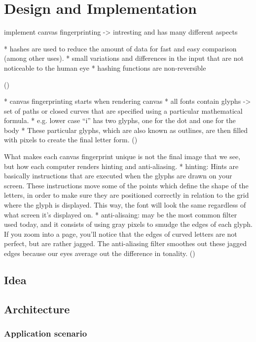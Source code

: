 \chapter{Design and Implementation}
\label{cha:implementation}
implement canvas fingerprinting -> intresting and has many different aspects


* hashes are used to reduce the amount of data for fast and easy comparison (among other uses).
* small variations and differences in the input that are not noticeable to the human eye
* hashing functions are non-reversible

(\textcite{multilogin17})

* canvas fingerprinting starts when rendering canvas
* all fonts contain glyphs ->  set of paths or closed curves that are specified using a particular mathematical formula. 
* e.g. lower case “i” has two glyphs, one for the dot and one for the body
* These particular glyphs, which are also known as outlines, are then filled with pixels to create the final letter form.
(\textcite{multilogin17})

What makes each canvas fingerprint unique is not the final image that we see, but how each computer renders hinting and anti-aliasing.
* hinting: Hints are basically instructions that are executed when the glyphs are drawn on your screen. These instructions move some of the points which define the shape of the letters, in order to make sure they are positioned correctly in relation to the grid where the glyph is displayed. This way, the font will look the same regardless of what screen it’s displayed on.
* anti-alisaing: may be the most common filter used today, and it consists of using gray pixels to smudge the edges of each glyph. If you zoom into a page, you’ll notice that the edges of curved letters are not perfect, but are rather jagged. The anti-aliasing filter smoothes out these jagged edges because our eyes average out the difference in tonality.
(\textcite{multilogin17})

\section{Idea}

\section{Architecture}

\subsection{Application scenario}


